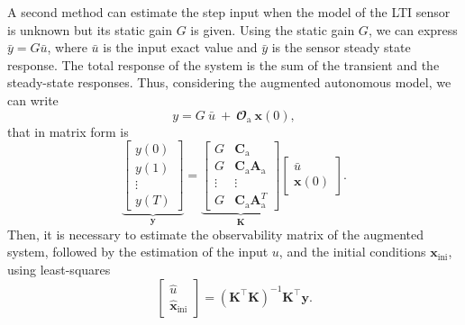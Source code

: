 
A second method can estimate the step input when the model of the LTI sensor is unknown but its static gain $G$ is given.
Using the static gain $G$, we can express $\bar{{y}} = G \bar{{u}}$, where $\bar{{u}}$ is the input exact value and $\bar{{y}}$ is the sensor steady state response.
The total response of the system is the sum of the transient and the steady-state responses.
Thus, considering the augmented autonomous model, we can write
\[ {y} = G \ \bar{{u}} \ + \ \mathbfcal{O}_\text{a} \ \mathbf{x}(0) , \]
that in matrix form is
\[ \underbrace{ \begin{bmatrix}y(0) \\ y(1) \\ \vdots \\ y(T) \end{bmatrix}}_{\mathbf{y}} = \underbrace{ \begin{bmatrix} G & \mathbf{C}_\text{a} \\ G & \mathbf{C}_\text{a} \mathbf{A}_\text{a} \\ \vdots & \vdots \\ G & \mathbf{C}_\text{a} \mathbf{A}_\text{a}^T \end{bmatrix}}_{\mathbf{K}} \begin{bmatrix} \bar{{u}} \\ \mathbf{x}(0) \end{bmatrix} .\]
Then, it is necessary to estimate the observability matrix of the augmented system, followed by the estimation of the input  ${u}$, and the initial conditions $\mathbf{x}_{\text{ini}}$, using least-squares
\[ \begin{bmatrix} \widehat{{u}} \\ \widehat{\mathbf{x}}_{\text{ini}} \end{bmatrix} = \left( \mathbf{K}^\top \mathbf{K} \right)^{-1} \mathbf{K}^\top \mathbf{y}. \]



